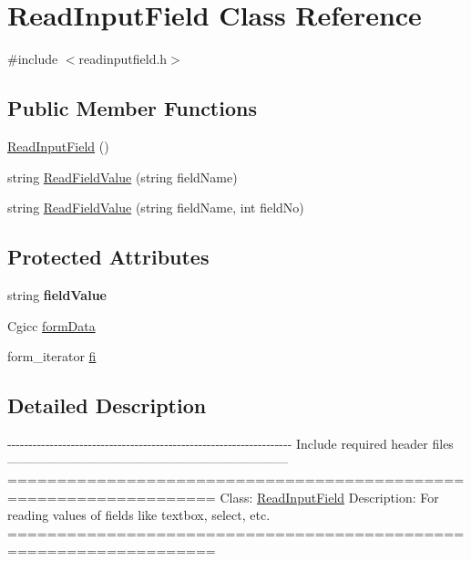 \hypertarget{classReadInputField}{\section{Read\-Input\-Field Class Reference}
\label{classReadInputField}
}


{\ttfamily \#include $<$readinputfield.\-h$>$}

\subsection*{Public Member Functions}
\begin{DoxyCompactItemize}
\item 
\hyperlink{classReadInputField_aae743343381035c28a3a0111fc353c7f}{Read\-Input\-Field} ()
\item 
string \hyperlink{classReadInputField_a7f6e49b47412649644cc644927ccc682}{Read\-Field\-Value} (string field\-Name)
\item 
string \hyperlink{classReadInputField_accf7ceba77721a35968c69268e4e559e}{Read\-Field\-Value} (string field\-Name, int field\-No)
\end{DoxyCompactItemize}
\subsection*{Protected Attributes}
\begin{DoxyCompactItemize}
\item 
\hypertarget{classReadInputField_a0d95496b5fc8fb4badd4af19492182ae}{string {\bfseries field\-Value}}\label{classReadInputField_a0d95496b5fc8fb4badd4af19492182ae}

\item 
Cgicc \hyperlink{classReadInputField_a1e4ebac8979fd9b2771320d669fce5fc}{form\-Data}
\item 
form\-\_\-iterator \hyperlink{classReadInputField_ae252dc321be04c2c1afa6928ad16a45d}{fi}
\end{DoxyCompactItemize}


\subsection{Detailed Description}
-\/-\/-\/-\/-\/-\/-\/-\/-\/-\/-\/-\/-\/-\/-\/-\/-\/-\/-\/-\/-\/-\/-\/-\/-\/-\/-\/-\/-\/-\/-\/-\/-\/-\/-\/-\/-\/-\/-\/-\/-\/-\/-\/-\/-\/-\/-\/-\/-\/-\/-\/-\/-\/-\/-\/-\/-\/-\/-\/-\/-\/-\/-\/-\/-\/-\/-\/ Include required header files ------------------------------------------------------------------ =================================================================== Class\-: \hyperlink{classReadInputField}{Read\-Input\-Field} Description\-: For reading values of fields like textbox, select, etc. =================================================================== 

